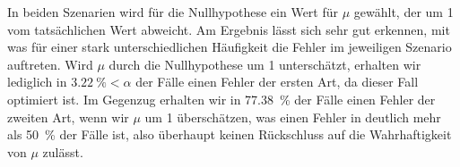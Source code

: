 \documentclass[a4paper]{scrartcl}
\def \blattnr {9}
\begin{document}
\begin{enumerate}[label=\bfseries \blattnr.\arabic*]
      In beiden Szenarien wird für die Nullhypothese ein Wert für $\mu$
      gewählt, der um 1 vom tatsächlichen Wert abweicht. Am Ergebnis lässt sich
      sehr gut erkennen, mit was für einer stark unterschiedlichen Häufigkeit
      die Fehler im jeweiligen Szenario auftreten. Wird $\mu$ durch die
      Nullhypothese um 1 unterschätzt, erhalten wir lediglich in
      $\SI{3.22}{\percent} < \alpha$ der Fälle einen Fehler der ersten Art, da
      dieser Fall optimiert ist. Im Gegenzug erhalten wir in
      \SI{77.38}{\percent} der Fälle einen Fehler der zweiten Art, wenn wir
      $\mu$ um 1 überschätzen, was einen Fehler in deutlich mehr als
      \SI{50}{\percent} der Fälle ist, also überhaupt keinen Rückschluss auf
      die Wahrhaftigkeit von $\mu$ zulässt.

\end{enumerate}
\end{document}
